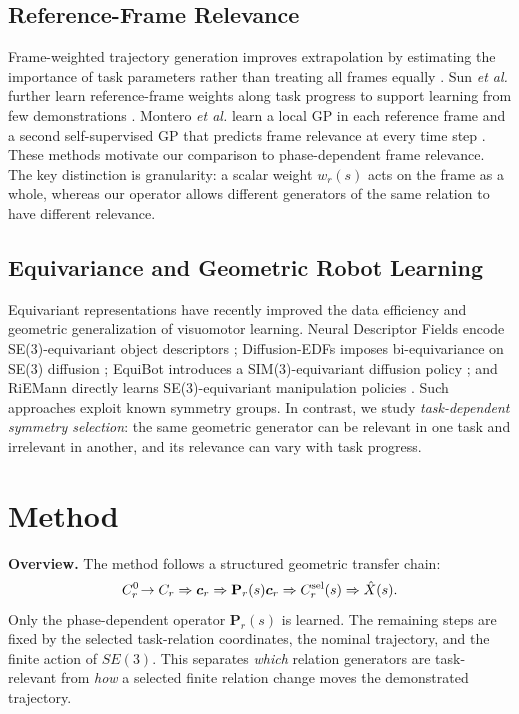 \documentclass[letterpaper,10pt,conference]{ieeeconf}
\begin{document}
\subsection{Reference-Frame Relevance}

Frame-weighted trajectory generation improves extrapolation by estimating the
importance of task parameters rather than treating all frames equally
\cite{Sena2019FrameWeighted}. Sun \emph{et al.} further learn reference-frame
weights along task progress to support learning from few demonstrations
\cite{Sun2024FrameWeighted}. Montero \emph{et al.} learn a local GP in each
reference frame and a second self-supervised GP that predicts frame relevance
at every time step \cite{Montero2024TPGP}. These methods motivate our comparison
to phase-dependent frame relevance. The key distinction is granularity:
a scalar weight $w_r(s)$ acts on the frame as a whole, whereas our operator
allows different generators of the same relation to have different relevance.

\subsection{Equivariance and Geometric Robot Learning}

Equivariant representations have recently improved the data efficiency and
geometric generalization of visuomotor learning. Neural Descriptor Fields
encode SE(3)-equivariant object descriptors \cite{Simeonov2022NDF};
Diffusion-EDFs imposes bi-equivariance on SE(3) diffusion
\cite{Ryu2024DiffusionEDF}; EquiBot introduces a SIM(3)-equivariant diffusion
policy \cite{Yang2024EquiBot}; and RiEMann directly learns SE(3)-equivariant
manipulation policies \cite{Gao2024RiEMann}. Such approaches exploit known
symmetry groups. In contrast, we study \emph{task-dependent symmetry
selection}: the same geometric generator can be relevant in one task and
irrelevant in another, and its relevance can vary with task progress.

\section{Method}
\label{sec:method}

\textbf{Overview.}
The method follows a structured geometric transfer chain:
\[
C_r^0\!\rightarrow C_r
\Rightarrow \bm c_r
\Rightarrow \mathbf P_r(s)\bm c_r
\Rightarrow C_r^{\rm sel}(s)
\Rightarrow \hat X(s).
\]
Only the phase-dependent operator $\mathbf P_r(s)$ is learned. The remaining
steps are fixed by the selected task-relation coordinates, the nominal
trajectory, and the finite action of $SE(3)$. This separates \emph{which}
relation generators are task-relevant from \emph{how} a selected finite relation
change moves the demonstrated trajectory.
\end{document}
